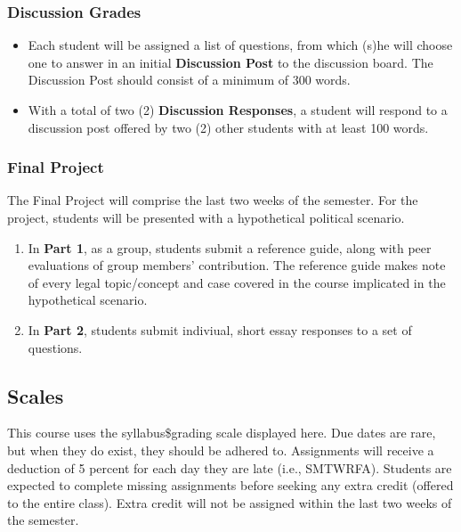 \documentclass[10pt,]{article}
\providecommand{\tightlist}{%
  \setlength{\itemsep}{0pt}\setlength{\parskip}{0pt}}
\begin{document}
\hypertarget{discussion-grades}{%
\subsubsection{Discussion Grades}\label{discussion-grades}}

\begin{itemize}
\tightlist
\item
  Each student will be assigned a list of questions, from which (s)he
  will choose one to answer in an initial \textbf{Discussion Post} to
  the discussion board. The Discussion Post should consist of a minimum
  of 300 words.
\item
  With a total of two (2) \textbf{Discussion Responses}, a student will
  respond to a discussion post offered by two (2) other students with at
  least 100 words.
\end{itemize}

\hypertarget{final-project}{%
\subsubsection{Final Project}\label{final-project}}

The Final Project will comprise the last two weeks of the semester. For
the project, students will be presented with a hypothetical political
scenario.

\begin{enumerate}
\def\labelenumi{\arabic{enumi}.}
\tightlist
\item
  In \textbf{Part 1}, as a group, students submit a reference guide,
  along with peer evaluations of group members' contribution. The
  reference guide makes note of every legal topic/concept and case
  covered in the course implicated in the hypothetical scenario.
\item
  In \textbf{Part 2}, students submit indiviual, short essay responses
  to a set of questions.
\end{enumerate}

\hypertarget{scales}{%
\subsection{Scales}\label{scales}}

This course uses the syllabus\$grading scale displayed here. Due dates
are rare, but when they do exist, they should be adhered to. Assignments
will receive a deduction of 5 percent for each day they are late (i.e.,
SMTWRFA). Students are expected to complete missing assignments before
seeking any extra credit (offered to the entire class). Extra credit
will not be assigned within the last two weeks of the semester.
\end{document}

